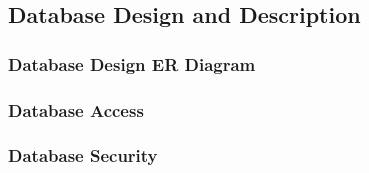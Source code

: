 \documentclass{article}
\begin{document}
\pagebreak
\subsection{Database Design and Description}

\subsubsection{Database Design ER Diagram}
\label{dded}

\subsubsection{Database Access}
\label{da}

\subsubsection{Database Security}
\label{ds}

\end{document}
